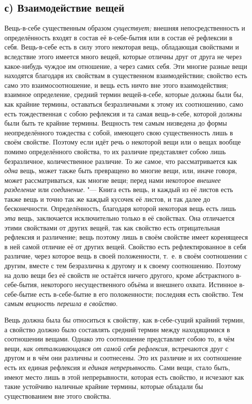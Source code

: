 \subsection[с) Взаимодействие вещей]{с) Взаимодействие вещей}
Вещь-в-себе существенным образом
{\em существует;} внешняя непосредственность и
определённость входят в состав её в-себе-бытия или в состав её рефлексии в
себя. Вещь-в-себе есть в силу этого некоторая вещь, обладающая свойствами и
вследствие этого имеется много вещей, которые отличны друг от друга не
через какое-нибудь чуждое им отношение, а через самих себя. Эти многие
разные вещи находятся благодаря их свойствам в существенном взаимодействии;
свойство есть само это взаимосоотношение, и вещь есть ничто вне этого
взаимодействия; взаимное определение, средний термин вещей-в-себе, которые
должны были бы, как крайние термины, оставаться безразличными к этому их
соотношению, само есть тождественная с собою рефлексия и та самая
вещь-в-себе, которой должны были быть те крайние термины. Вещность тем
самым низведена до формы неопределённого тождества с собой, имеющего свою
существенность лишь в своём свойстве. Поэтому если идёт речь о некоторой
вещи или о вещах вообще помимо определённого свойства, то их различие
представляет собою лишь безразличное, количественное различие. То же самое,
что рассматривается как {\em одна} вещь, может также
быть превращено во многие вещи, или, иначе говоря, может рассматриваться,
как многие вещи; перед нами некоторое {\em внешнее
разделение} или {\em соединение}. "--- Книга есть вещь, и
каждый из её листов есть также вещь и точно так же каждый кусочек её
листов, и так далее до бесконечности. Определённость, благодаря которой
некоторая вещь есть лишь {\em эта} вещь, заключается
исключительно только в её свойствах. Она отличается этими свойствами от
других вещей, так как свойство есть отрицательная рефлексия и различение;
вещь поэтому лишь в своём свойстве имеет коренящееся в ней самой отличие её
от других вещей. Свойство есть рефлектированное в себя различие, через
которое вещь в своей положенности, т.~е. в своём соотношении с другим,
вместе с тем безразлична к другому и к своему соотношению. Поэтому на долю
вещи без её свойств не остаётся ничего другого, кроме абстрактного
в-себе-бытия, некоторого несущественного объёма и внешнего охвата. Истинное
в-себе-бытие есть в-себе-бытие в его положенности; последняя есть свойство.
Тем самым {\em вещность перешла в свойство}.

Вещь должна была бы относиться к свойству, как в-себе-сущий крайний термин,
а свойство должно было составлять средний термин между находящимися в
соотношении вещами. Однако это соотношение представляет собою то, в чём
вещи, {\em как отталкивающаяся от самой себя
рефлексия,} встречаются друг с другом и в чём они различны и соотнесены.
Это их различие и их соотношение есть их единая рефлексия и
{\em единая непрерывность}. Сами вещи, стало быть,
имеют место лишь в этой непрерывности, которая есть свойство, и исчезают
как такие устойчиво наличные крайние термины, которые обладали бы
существованием вне этого свойства.

